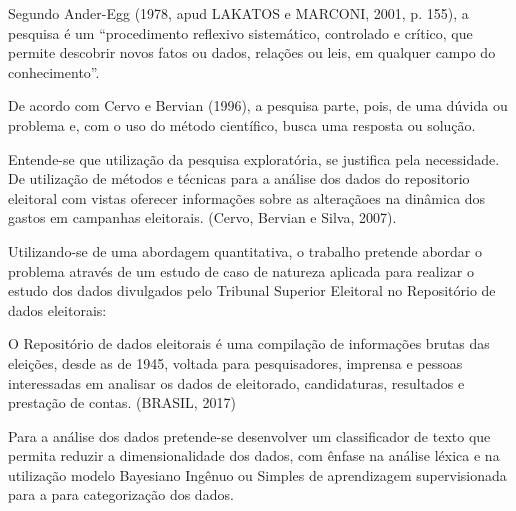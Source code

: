\documentclass[
	12pt,				%
	openright,			%
	oneside,			%
	a4paper,			%
	english,			%
	french,				%
	spanish,			%
	brazil,				%
	]{abntex2}
\begin{document}
Segundo Ander-Egg (1978, apud LAKATOS e MARCONI, 2001, p. 155), a pesquisa é um “procedimento reflexivo sistemático, controlado e crítico, que permite descobrir novos fatos ou dados, relações ou leis, em qualquer campo do conhecimento”.

De acordo com Cervo e Bervian (1996), a pesquisa parte, pois, de uma dúvida ou problema e, com o uso do método científico, busca uma resposta ou solução.

Entende-se que utilização da pesquisa exploratória, se justifica pela necessidade. De utilização de métodos e técnicas para a análise dos dados do repositorio eleitoral com vistas oferecer informações sobre as alteraçãoes na dinâmica dos gastos em campanhas eleitorais. (Cervo, Bervian e Silva, 2007).

Utilizando-se de uma abordagem quantitativa, o trabalho pretende abordar o problema através de um estudo de caso de natureza aplicada para realizar o estudo dos dados divulgados pelo Tribunal Superior Eleitoral no Repositório de dados eleitorais:

\begin{citacao}
 O Repositório de dados eleitorais é uma compilação de informações brutas das eleições, desde as de 1945, voltada para pesquisadores, imprensa e pessoas interessadas em analisar os dados de eleitorado, candidaturas, resultados e prestação de contas. (BRASIL, 2017)
\end{citacao}

Para a análise dos dados pretende-se desenvolver um classificador de texto que permita reduzir a dimensionalidade dos dados, com ênfase na análise léxica e na utilização modelo Bayesiano Ingênuo ou Simples de aprendizagem supervisionada para a para categorização dos dados.




\postextual




\end{document}
